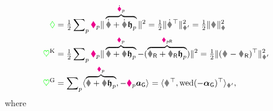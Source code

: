 \begin{subequations}
\begin{align}
 \dissFkt
 &= \tfrac{1}{2} \sumParticles \particleDamping{\PidxI} \norm{\overbrace{\rd + \bodyRotd{}{}{}{} \particleBodyPos{\PidxI}}^{\particlePosd{\PidxI}}}^2
 = \tfrac{1}{2} \norm[\bodyDissMatp{}{}]{\bodyHomoCoordd{}{}^\top}^2
 = \tfrac{1}{2} \norm[\bodyDissMat{}{}]{\bodyVel{}{}}^2
\\
 \potentialStiff
 &= \tfrac{1}{2} \sumParticles \particleStiffness{\PidxI} \norm{\overbrace{\r + \R\particleBodyPos{\PidxI}}^{\particlePos{\PidxI}} - (\overbrace{\rR + \RR\particleBodyPos{\PidxI}}^{\particlePosR{\PidxI}})}^2
 = \tfrac{1}{2} \norm[\bodyStiffMatp{}{}]{(\bodyHomoCoord{}{} - \bodyHomoCoordR{}{})^\top}^2
\\
 \label{eq:RBGravityEnergyHomo}
 \potentialGravity 
 &= \sumParticles \sProd{\overbrace{\r + \R \particleBodyPos{\PidxI}}^{\particlePos{\PidxI}}}{-\particleMass{\PidxI} \gravityAcc}
 = \sProd[\bodyInertiaMatp{}{}]{\G^\top}{\wedOp(-\gravityAccWrench)^\top},
\end{align}
\end{subequations}
where
